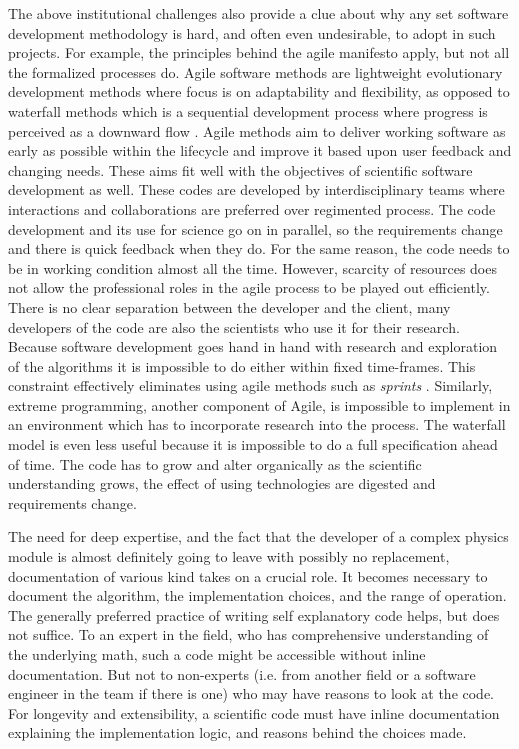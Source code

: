 The above institutional challenges also provide a clue about why any
set software development methodology is hard, and often even
undesirable, to adopt in such projects. For example, the principles
behind the agile manifesto apply, but not all the formalized processes
do. Agile software methods \cite{agile} are lightweight evolutionary development
methods where focus is on adaptability and flexibility, as opposed to
waterfall methods which is a sequential development process where
progress is perceived as a downward flow \cite{waterfall}. 
Agile methods aim to deliver working software as early as possible
within the lifecycle and improve it based upon user feedback and
changing needs. These aims fit well with the objectives of scientific
software development as well. 
These codes are developed by interdisciplinary teams where
interactions and collaborations are preferred over regimented process. The code
development and its use for science go on in parallel, so the
requirements change and there is quick feedback when they do.  For the
same reason, the code needs to be in working condition almost all the
time. However, scarcity of resources does not allow the professional roles in
the agile process to be played out efficiently.  There is no clear
separation between the developer and the client, many developers of
the code are also the scientists who use it for their research. 
Because software development goes hand in hand with research and
exploration of the algorithms it is impossible to do either within
fixed time-frames. This constraint effectively eliminates using agile
methods such as {\em sprints} \cite{agile}. Similarly, extreme
programming, another component of Agile, is impossible to implement in an environment which has to
incorporate research into the process. The waterfall model is even less
useful because it is impossible to do a full specification ahead of
time. The code has to grow and alter organically as the scientific
understanding grows, the effect of using technologies are digested and
requirements change. 

The need for deep expertise, and the fact that the developer of a
complex physics module is almost definitely going to leave with
possibly no replacement, documentation of various kind takes on a
crucial role. It becomes necessary to document the algorithm, the
implementation choices, and the range of operation. The generally
preferred practice of writing self explanatory code helps, but does
not suffice. To an expert in the field, who has comprehensive
understanding of the underlying math, such a code might be accessible
without inline documentation. But not to non-experts (i.e. from
another field or a software engineer in the team if there is one) who
may have reasons to look at the code. For longevity and
extensibility, a scientific code must have inline documentation
explaining the implementation logic, and reasons behind the
choices made.   
